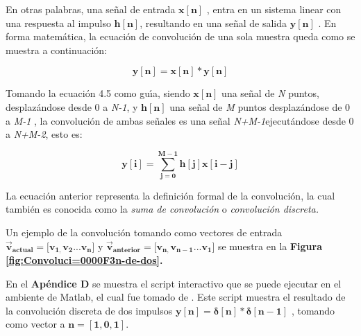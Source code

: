 En otras palabras, una se\~{n}al de entrada $\mathbf{x[n]}$ , entra
en un sistema linear con una respuesta al impulso $\mathbf{h[n]}$,
resultando en una se\~{n}al de salida $\mathbf{y[n]}$ . En forma
matem\'{a}tica, la ecuaci\'{o}n de convoluci\'{o}n de una sola muestra
queda como se muestra a continuaci\'{o}n:

\begin{equation}
\mathbf{y[n]=x[n]*y[n]}
\end{equation}

Tomando la ecuaci\'{o}n 4.5 como gu\'{\i}a, siendo $\mathbf{x[n]}$
una se\~{n}al de \emph{N} puntos, desplaz\'{a}ndose desde 0 a \emph{N-1},
y $\mathbf{h[n]}$ una se\~{n}al de \emph{M} puntos desplaz\'{a}ndose
de 0 a \emph{M-1}\cite{dspguide_conv} , la convoluci\'{o}n de ambas
se\~{n}ales es una se\~{n}al \emph{N+M-1}ejecut\'{a}ndose desde 0
a \emph{N+M-2}, esto es:

\begin{equation}
\mathbf{y[i]=\sum_{j=0}^{M-1}h[j]}\mathbf{x[i-j]}
\end{equation}

La ecuaci\'{o}n anterior representa la definici\'{o}n formal de la
convoluci\'{o}n, la cual tambi\'{e}n es conocida como la \emph{suma
de convoluci\'{o}n} o \emph{convoluci\'{o}n discreta.}

Un ejemplo de la convoluci\'{o}n tomando como vectores de entrada
$\mathbf{\overrightarrow{v}_{actual}=[v_{1,}v_{2}...}\mathbf{v_{n}]}$
y $\mathbf{\overrightarrow{v}_{anterior}=[v_{n,}v_{n-1}...}\mathbf{v_{1}]}$
se muestra en la \textbf{Figura \ref{fig:Convoluci=0000F3n-de-dos}. }

En el \textbf{Ap\'{e}ndice D} se muestra el script interactivo que
se puede ejecutar en el ambiente de Matlab, el cual fue tomado de
\cite{eece_matlab} . Este script muestra el resultado de la convoluci\'{o}n
discreta de dos impulsos $\mathbf{y[n]=\delta[n]*\delta[n-1]}$ ,
tomando como vector a $\mathbf{n=[1,0,1]}$.


